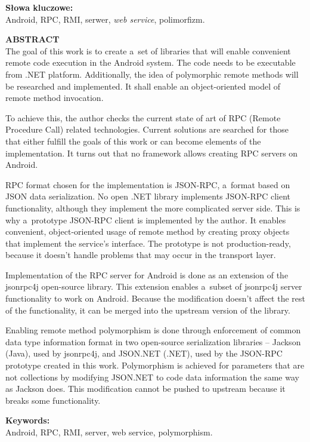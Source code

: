 \documentclass[twoside,a4paper]{book}
\begin{document}
\noindent\textbf{Słowa kluczowe:} \\
Android, RPC, RMI, serwer, \emph{web service}, polimorfizm.
\clearpage

{\noindent \large \textbf{ABSTRACT}} \\
The goal of this work is to create a~set of libraries that will enable convenient remote code execution in the Android system.
The code needs to be executable from .NET platform.
Additionally, the idea of polymorphic remote methods will be researched and implemented.
It shall enable an object-oriented model of remote method invocation.

To achieve this, the author checks the current state of art of RPC (Remote Procedure Call) related technologies.
Current solutions are searched for those that either fulfill the goals of this work or can become elements of the implementation.
It turns out that no framework allows creating RPC servers on Android.

RPC format chosen for the implementation is JSON-RPC, a~format based on JSON data serialization.
No open .NET library implements JSON-RPC client functionality, although they implement the more complicated server side.
This is why a~prototype JSON-RPC client is implemented by the author. It enables convenient, object-oriented usage of remote method by creating proxy objects that implement the service's interface.
The prototype is not production-ready, because it doesn't handle problems that may occur in the transport layer. 

Implementation of the RPC server for Android is done as an extension of the jsonrpc4j open-source library.
This extension enables a~subset of jsonrpc4j server functionality to work on Android.
Because the modification doesn't affect the rest of the functionality, it can be merged into the upstream version of the library.

Enabling remote method polymorphism is done through enforcement of common data type information format in two open-source serialization libraries -- Jackson (Java), used by jsonrpc4j, and JSON.NET (.NET), used by the JSON-RPC prototype created in this work.
Polymorphism is achieved for parameters that are not collections by modifying JSON.NET to code data information the same way as Jackson does.
This modification cannot be pushed to upstream because it breaks some functionality.

\noindent\textbf{Keywords:} \\
Android, RPC, RMI, server, web service, polymorphism.
\clearpage
\end{document}
